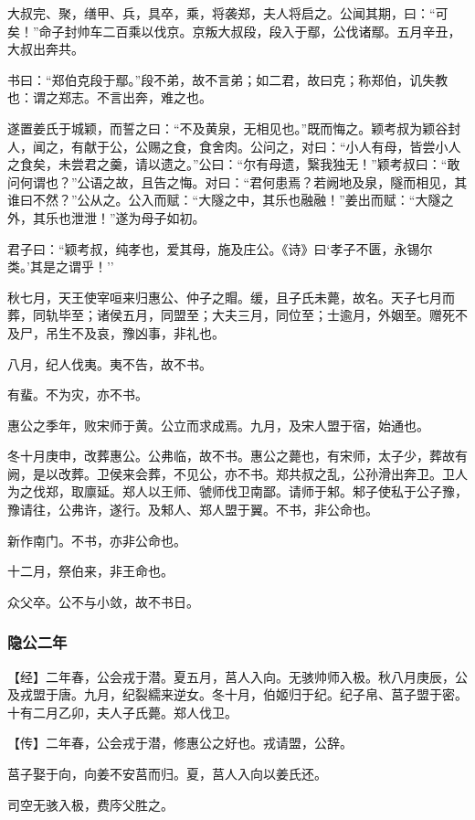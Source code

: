 \documentclass[]{article}
\begin{document}
大叔完、聚，缮甲、兵，具卒，乘，将袭郑，夫人将启之。公闻其期，曰：``可矣！''命子封帅车二百乘以伐京。京叛大叔段，段入于鄢，公伐诸鄢。五月辛丑，大叔出奔共。

书曰：``郑伯克段于鄢。''段不弟，故不言弟；如二君，故曰克；称郑伯，讥失教也：谓之郑志。不言出奔，难之也。

遂置姜氏于城颖，而誓之曰：``不及黄泉，无相见也。''既而悔之。颖考叔为颖谷封人，闻之，有献于公，公赐之食，食舍肉。公问之，对曰：``小人有母，皆尝小人之食矣，未尝君之羹，请以遗之。''公曰：``尔有母遗，繄我独无！''颖考叔曰：``敢问何谓也？''公语之故，且告之悔。对曰：``君何患焉？若阙地及泉，隧而相见，其谁曰不然？''公从之。公入而赋：``大隧之中，其乐也融融！''姜出而赋：``大隧之外，其乐也泄泄！''遂为母子如初。

君子曰：``颖考叔，纯孝也，爱其母，施及庄公。《诗》曰`孝子不匮，永锡尔类。'其是之谓乎！''

秋七月，天王使宰咺来归惠公、仲子之賵。缓，且子氏未薨，故名。天子七月而葬，同轨毕至；诸侯五月，同盟至；大夫三月，同位至；士逾月，外姻至。赠死不及尸，吊生不及哀，豫凶事，非礼也。

八月，纪人伐夷。夷不告，故不书。

有蜚。不为灾，亦不书。

惠公之季年，败宋师于黄。公立而求成焉。九月，及宋人盟于宿，始通也。

冬十月庚申，改葬惠公。公弗临，故不书。惠公之薨也，有宋师，太子少，葬故有阙，是以改葬。卫侯来会葬，不见公，亦不书。郑共叔之乱，公孙滑出奔卫。卫人为之伐郑，取廪延。郑人以王师、虢师伐卫南鄙。请师于邾。邾子使私于公子豫，豫请往，公弗许，遂行。及邾人、郑人盟于翼。不书，非公命也。

新作南门。不书，亦非公命也。

十二月，祭伯来，非王命也。

众父卒。公不与小敛，故不书日。

\hypertarget{header-n29}{%
\subsubsection{隐公二年}\label{header-n29}}

【经】二年春，公会戎于潜。夏五月，莒人入向。无骇帅师入极。秋八月庚辰，公及戎盟于唐。九月，纪裂繻来逆女。冬十月，伯姬归于纪。纪子帛、莒子盟于密。十有二月乙卯，夫人子氏薨。郑人伐卫。

【传】二年春，公会戎于潜，修惠公之好也。戎请盟，公辞。

莒子娶于向，向姜不安莒而归。夏，莒人入向以姜氏还。

司空无骇入极，费庈父胜之。
\end{document}
